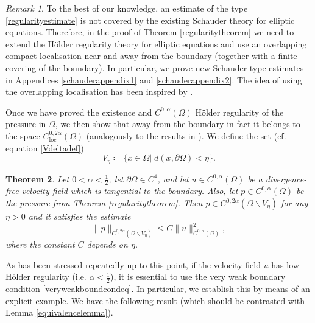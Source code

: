 \documentclass[12pt,a4paper]{article}
\newtheorem{theorem}{Theorem}[section]
\theoremstyle{definition}
\theoremstyle{remark}
\newtheorem{remark}[theorem]{Remark}
\numberwithin{equation}{section}
\begin{document}
\begin{remark}
To the best of our knowledge, an estimate of the type \eqref{regularityestimate} is not covered by the existing Schauder theory for elliptic equations. Therefore, in the proof of Theorem \ref{regularitytheorem} we need to extend the Hölder regularity theory for elliptic equations and use an overlapping compact localisation near and away from the boundary (together with a finite covering of the boundary). In particular, we prove new Schauder-type estimates in Appendices \ref{schauderappendix1} and \ref{schauderappendix2}. The idea of using the overlapping localisation has been inspired by \cite{kukavicainviscid}.
\end{remark}
Once we have proved the existence and $C^{0,\alpha} (\Omega)$ Hölder regularity of the pressure in $\Omega$, we then show that away from the boundary in fact it belongs to the space $C^{0,2 \alpha}_{\mathrm{loc}} (\Omega)$ (analogously to the results in \cite{silvestre}). We define the set (cf. equation \eqref{Vdeltadef})
\begin{equation*}
V_{\eta} \coloneqq \{ x \in \Omega \lvert \; d(x, \partial \Omega) < \eta \}.
\end{equation*}
\begin{theorem} \label{doubleregularitythm}
Let $0 < \alpha < \frac{1}{2}$, let $\partial \Omega \in C^4$, and let $u \in C^{0,\alpha} (\Omega)$ be a divergence-free velocity field which is tangential to the boundary. Also, let $p \in C^{0,\alpha} (\Omega)$ be the pressure from Theorem \ref{regularitytheorem}. Then $p \in C^{0,2 \alpha} (\Omega \backslash V_{\eta} )$ for any $\eta > 0$ and it satisfies the estimate
\begin{equation}
\lVert p \rVert_{C^{0,2 \alpha} (\Omega \backslash V_{\eta} )} \leq C \lVert u \rVert_{C^{0,\alpha} (\Omega)}^2,
\end{equation}
where the constant $C$ depends on $\eta$.
\end{theorem}
As has been stressed repeatedly up to this point, if the velocity field $u$ has low Hölder regularity (i.e. $\alpha < \frac{1}{2}$), it is essential to use the very weak boundary condition \eqref{veryweakboundcondeq}. In particular, we establish this by means of an explicit example. We have the following result (which should be contrasted with Lemma \ref{equivalencelemma}).
\end{document}

